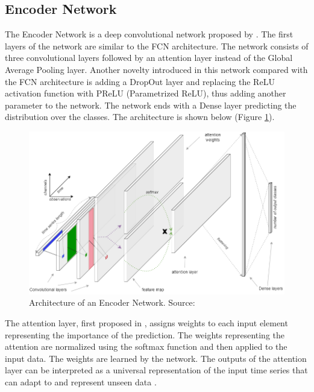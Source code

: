 \documentclass[a4paper,11pt,twoside]{report}
\theoremstyle{definition}
\begin{document}
\FloatBarrier

\subsection{Encoder Network}
 The Encoder Network is a deep convolutional network proposed by \cite{encoder}. The first layers of the network are similar to the FCN architecture. The network consists of three convolutional layers followed by an attention layer instead of the Global Average Pooling layer. Another novelty introduced in this network compared with the FCN architecture is adding a DropOut layer and replacing the ReLU activation function with PReLU (Parametrized ReLU), thus adding another parameter to the network. The network ends with a Dense layer predicting the distribution over the classes. The architecture is shown below (Figure \ref{fig:encoder_img}).

\FloatBarrier

\begin{figure}[h!]
\centering
\includegraphics[width=14cm]{imgs/encoder.png}
\caption{Architecture of an Encoder Network. Source: \cite{dl_tsc}}
\label{fig:encoder_img}
\end{figure}

\FloatBarrier

The attention layer, first proposed in \cite{attention}, assigns weights to each input element representing the importance of the prediction. The weights representing the attention are normalized using the softmax function and then applied to the input data. The weights  are learned by the network. The outputs of the attention layer can be interpreted as a universal representation of the input time series that can adapt to and represent unseen data \cite{encoder}.
\end{document}
